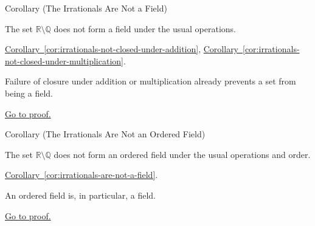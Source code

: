 \begin{corollarybox}{Corollary (The Irrationals Are Not a Field)}
\begin{corollary}
\label{cor:irrationals-are-not-a-field}
The set $\mathbb{R}\setminus\mathbb{Q}$ does not form a field under the usual
operations.
\end{corollary}
\end{corollarybox}
\begin{dependencies}
\hyperref[cor:irrationals-not-closed-under-addition]{Corollary~\ref*{cor:irrationals-not-closed-under-addition}},
\hyperref[cor:irrationals-not-closed-under-multiplication]{Corollary~\ref*{cor:irrationals-not-closed-under-multiplication}}.
\end{dependencies}
\begin{remark*}
Failure of closure under addition or multiplication already prevents a set from
being a field.
\end{remark*}
\begin{remark*}[Proof]
\hyperref[prf:irrationals-are-not-a-field]{Go to proof.}
\end{remark*}

\begin{corollarybox}{Corollary (The Irrationals Are Not an Ordered Field)}
\begin{corollary}
\label{cor:irrationals-are-not-an-ordered-field}
The set $\mathbb{R}\setminus\mathbb{Q}$ does not form an ordered field under the
usual operations and order.
\end{corollary}
\end{corollarybox}
\begin{dependencies}
\hyperref[cor:irrationals-are-not-a-field]{Corollary~\ref*{cor:irrationals-are-not-a-field}}.
\end{dependencies}
\begin{remark*}
An ordered field is, in particular, a field.
\end{remark*}
\begin{remark*}[Proof]
\hyperref[prf:irrationals-are-not-an-ordered-field]{Go to proof.}
\end{remark*}
